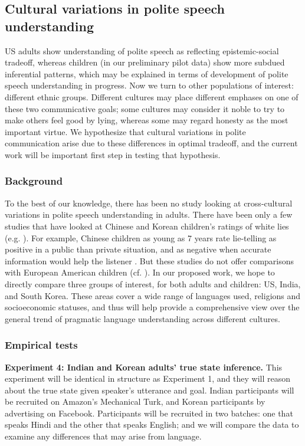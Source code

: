 \subsection{Cultural variations in polite speech understanding}
\label{sec:culture}

US adults show understanding of polite speech as reflecting epistemic-social tradeoff, whereas children (in our preliminary pilot data) show more subdued inferential patterns, which may be explained in terms of development of polite speech understanding in progress. Now we turn to other populations of interest: different ethnic groups. Different cultures may place different emphases on one of these two communicative goals; some cultures may consider it noble to try to make others feel good by lying, whereas some may regard honesty as the most important virtue. We hypothesize that cultural variations in polite communication arise due to these differences in optimal tradeoff, and the current work will be important first step in testing that hypothesis. 

\subsubsection{Background} 

To the best of our knowledge, there has been no study looking at cross-cultural variations in polite speech understanding in adults. There have been only a few studies that have looked at Chinese and Korean children's ratings of white lies (e.g. \citealt{fu2007, ma2011}). For example, Chinese children as young as 7 years rate lie-telling as positive in a public than private situation, and as negative when accurate information would help the listener \citep{ma2011}. But these studies do not offer comparisons with European American children (cf. \citealt{lee1997}). In our proposed work, we hope to directly compare three groups of interest, for both adults and children: US, India, and South Korea. These areas cover a wide range of languages used, religions and socioeconomic statuses, and thus will help provide a comprehensive view over the general trend of pragmatic language understanding across different cultures.


\subsubsection{Empirical tests}


{\bf Experiment 4: Indian and Korean adults' true state inference.} 
This experiment will be identical in structure as Experiment 1, and they will reason about the true state given speaker's utterance and goal. Indian participants will be recruited on Amazon's Mechanical Turk, and Korean participants by advertising on Facebook. Participants will be recruited in two batches: one that speaks Hindi and the other that speaks English; and we will compare the data to examine any differences that may arise from language.  

